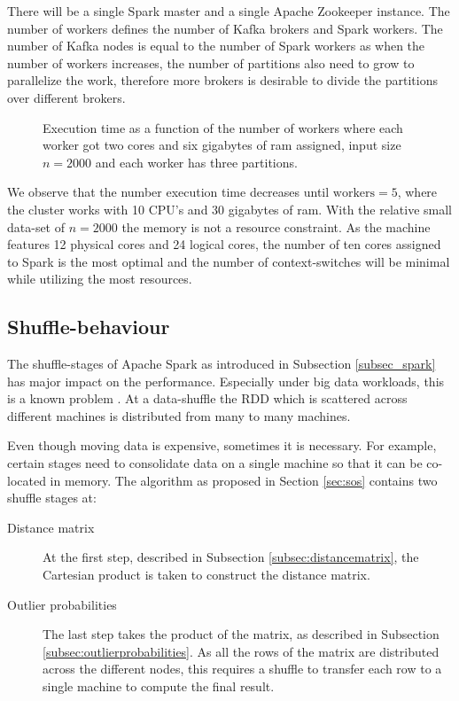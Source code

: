 There will be a single Spark master and a single Apache Zookeeper instance. The number of workers defines the number of Kafka brokers and Spark workers. The number of Kafka nodes is equal to the number of Spark workers as when the number of workers increases, the number of partitions also need to grow to parallelize the work, therefore more brokers is desirable to divide the partitions over different brokers.

\begin{figure}[ht!]
    \begin{center}
        
        \caption[Execution time as a function of workers.]{Execution time as a function of the number of workers where each worker got two cores and six gigabytes of ram assigned, input size $n=2000$ and each worker has three partitions.}
        \label{fig:parallelization}
    \end{center}
\end{figure}

We observe that the number execution time decreases until $\text{workers} = 5$, where the cluster works with 10 CPU's and 30 gigabytes of ram. With the relative small data-set of $n=2000$ the memory is not a resource constraint. As the machine features 12 physical cores and 24 logical cores, the number of ten cores assigned to Spark is the most optimal and the number of context-switches will be minimal while utilizing the most resources.

\subsection{Shuffle-behaviour \label{subsec:shuffle-behaviour}}

The shuffle-stages of Apache Spark as introduced in Subsection \ref{subsec_spark} has major impact on the performance. Especially under big data workloads, this is a known problem \cite{Chen:2009:UTI:1592681.1592693}. At a data-shuffle the RDD which is scattered across different machines is distributed from many to many machines. 

Even though moving data is expensive, sometimes it is necessary. For example, certain stages need to consolidate data on a single machine so that it can be co-located in memory. The algorithm as proposed in Section \ref{sec:sos} contains two shuffle stages at:
\begin{description}
  \item[Distance matrix] At the first step, described in Subsection \ref{subsec:distancematrix}, the Cartesian product is taken to construct the distance matrix.
  \item[Outlier probabilities] The last step takes the product of the matrix, as described in Subsection \ref{subsec:outlierprobabilities}. As all the rows of the matrix are distributed across the different nodes, this requires a shuffle to transfer each row to a single machine to compute the final result.
\end{description}

